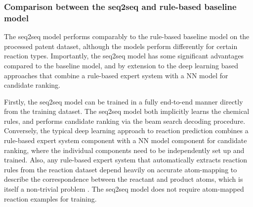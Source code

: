 \subsubsection{Comparison between the seq2seq and rule-based baseline model}

The seq2seq model performs comparably to the rule-based baseline model on the processed patent dataset, although the models perform differently for certain reaction types. Importantly, the seq2seq model has some significant advantages compared to the baseline model, and by extension to the deep learning based approaches that combine a rule-based expert system with a NN model for candidate ranking.

Firstly, the seq2seq model can be trained in a fully end-to-end manner directly from the training dataset. The seq2seq model both implicitly learns the chemical rules, and performs candidate ranking via the beam search decoding procedure. Conversely, the typical deep learning approach to reaction prediction combines a rule-based expert system component with a NN model component for candidate ranking, where the individual components need to be independently set up and trained. Also, any rule-based expert system that automatically extracts reaction rules from the reaction dataset depend heavily on accurate atom-mapping to describe the correspondence between the reactant and product atoms, which is itself a non-trivial problem \cite{chen2013automatic}. The seq2seq model does not require atom-mapped reaction examples for training. 

